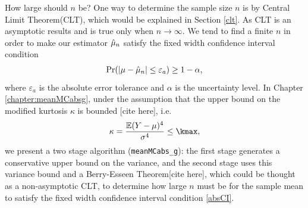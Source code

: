 \documentclass{iitthesis}
\begin{document}
How large should $n$ be? One way to determine the sample size $n$ is by Central Limit Theorem(CLT),  which would be explained in Section \ref{clt}. As CLT is an asymptotic results and is true only when $n \to \infty$. We tend to find a finite $n$ in order to make our estimator $\hat{\mu}_n$ satisfy the fixed width confidence interval condition 
\begin{align}\label{absCI}
\Pr(\left \lvert \mu-\hat{\mu}_n \right \rvert \leq \varepsilon_a) \geq 1-\alpha,
\end{align}
where $\varepsilon_a$ is the absolute error tolerance and $\alpha$ is the uncertainty level. 
In Chapter \ref{chapter:meanMCabsg}, under the assumption that the upper bound on the modified kurtosis $\kappa$ is bounded [cite here], i.e.
\begin{align}
\kappa = \frac{\e(Y-\mu)^4}{\sigma^4} \leq \kmax,
\end{align}
we present a two stage algorithm ({\tt meanMCabs\_g}): the first stage generates a conservative upper bound on the variance, and the second stage uses this variance bound and a Berry-Esseen Theorem[cite here], which could be thought as a non-asymptotic CLT, to determine how large $n$ must be for the sample mean to satisfy the fixed width confidence interval condition \eqref{absCI}.
\end{document}
